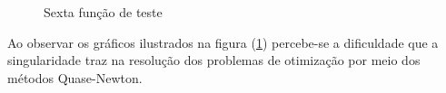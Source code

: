 \begin{figure}[h!]
    \centering 
    \qquad
    \qquad
    \caption{Sexta função de teste}%
    \label{fig:sexfun}%
\end{figure}
\FloatBarrier

Ao observar os gráficos ilustrados na figura (\ref{fig:sexfun}) percebe-se a dificuldade que a singularidade traz na resolução dos problemas de otimização por meio dos métodos Quase-Newton.

